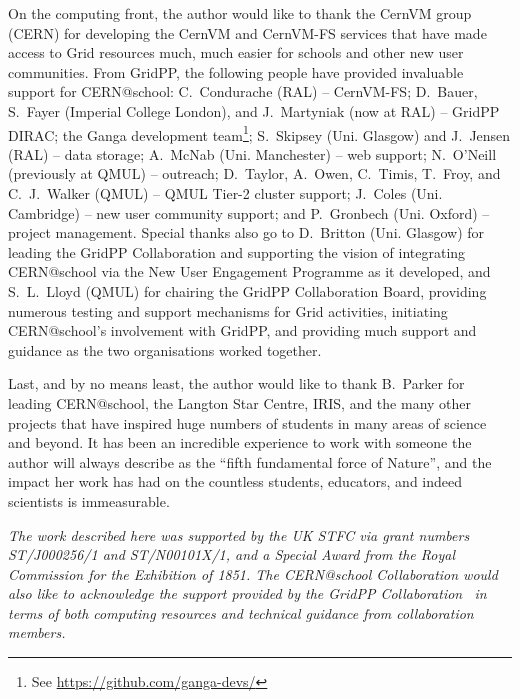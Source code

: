 On the computing front, the author would like to thank
the CernVM group (\acs{CERN}) for developing the CernVM
and CernVM-FS services that have made access to Grid resources
much, much easier for schools and other new user communities.
%
From GridPP, the following people have provided invaluable support
for CERN@school:
C.~Condurache (RAL) -- CernVM-FS;
%
D.~Bauer, S.~Fayer (Imperial College London),
and J.~Martyniak (now at RAL) -- GridPP DIRAC;
%
the Ganga development team\footnote{%
See \href{https://github.com/ganga-devs/}{https://github.com/ganga-devs/}};
S.~Skipsey (Uni. Glasgow) and J.~Jensen (RAL) -- data storage;
%
A.~McNab (Uni. Manchester) -- web support;
N.~O'Neill (previously at QMUL) -- outreach;
%
D.~Taylor, A.~Owen, C.~Timis, T.~Froy, and C.~J.~Walker (QMUL) -- QMUL Tier-2 cluster support;
%
J.~Coles (Uni. Cambridge) -- new user community support;
and
%
P.~Gronbech (Uni. Oxford) -- project management.
%
%
Special thanks also go to
D.~Britton (Uni. Glasgow) for leading the GridPP Collaboration
and supporting the vision of integrating CERN@school via
the New User Engagement Programme
as it developed,
and
%
S.~L.~Lloyd (QMUL) for chairing the GridPP Collaboration Board,
providing numerous testing and support mechanisms for Grid
activities, initiating CERN@school's involvement with GridPP,
and providing much support and guidance as the two
organisations worked together.

Last, and by no means least, the author would like to thank
B.~Parker for leading CERN@school, the Langton Star Centre,
\acs{IRIS}, and the many other projects that have inspired
huge numbers of students in many areas of science and beyond.
It has been an incredible experience to work with someone the
author will always describe as the
``fifth fundamental force of Nature'',
and the impact her work has had on the countless students,
educators, and indeed scientists is
immeasurable.

{\em The work described here was supported by the
UK \acf{STFC} via grant numbers ST/J000256/1 and ST/N00101X/1,
and a Special Award from the Royal Commission for the Exhibition of 1851.
%
The CERN@school Collaboration would also like to acknowledge the
support provided by
the GridPP Collaboration~\cite{GridPP2006,GridPP2009}
in terms of both computing resources and technical guidance
from collaboration members.}

